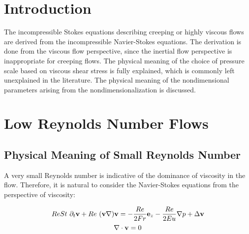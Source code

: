 
\providecommand{\divergenceNondim}{\nabla^{\prime}\cdot}

\providecommand{\velocityNondim}{\mathbf{v^{\prime}}}

\providecommand{\substDerivVelNondim}{\frac{D\velocity^{\prime}}{dt^{\prime}}}
\providecommand{\partialTimeVelNondim}{\partial_{t^{\prime}}\velocity^{\prime}}
\providecommand{\inertTermVelNondim}{(\velocity^{\prime}\nabla^{\prime})\velocity^{\prime}}

\providecommand{\velocityPressureTensorNondim}{\partial_l^{\prime}v^{k \prime}\partial_k^{\prime}v^{l \prime}}

\providecommand{\pressGradNondim}{\nabla^{\prime} p^{\prime}}
\providecommand{\pressLaplacianNondim}{\Delta^{\prime} p^{\prime}}
\providecommand{\laplacianVelNondim}{\Delta^{\prime}\velocity^{\prime}}

\section{Introduction}
 
The incompressible Stokes equations describing creeping or highly viscous flows are derived from the incompressible Navier-Stokes equations. The derivation is done from the viscous flow perspective, since the inertial flow perspective is inappropriate for creeping flows. The physical meaning of the choice of pressure scale based on viscous shear stress is fully explained, which is commonly left unexplained in the literature. The physical meaning of the nondimensional parameters arising from the nondimensionalization is discussed.

\section{Low Reynolds Number Flows}

\subsection{Physical Meaning of Small Reynolds Number}

A very small Reynolds number is indicative of the dominance of viscosity in the flow. Therefore, it is natural to consider the Navier-Stokes equations from the perspective of viscosity:

\begin{equation} \label{NS1-viscNondim}
Re St~ \partial_t\mathbf{v} + Re ~(\mathbf{v}\nabla)\mathbf{v} = -\frac{Re}{2Fr} \mathbf{e}_z - \frac{Re}{2 Eu}\nabla p + \Delta\mathbf{v} 
\end{equation}
\begin{equation} \label{NS2-viscNondim}
\nabla\cdot\mathbf{v} = 0 
\end{equation}

